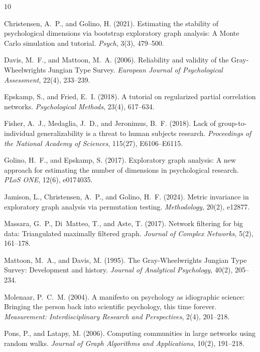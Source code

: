 \documentclass[11pt]{article}
\begin{document}

\begin{thebibliography}{10}

Christensen, A.~P., and Golino, H. (2021).
Estimating the stability of psychological dimensions via bootstrap
exploratory graph analysis: A Monte Carlo simulation and tutorial.
\emph{Psych}, 3(3), 479--500.

Davis, M.~F., and Mattoon, M.~A. (2006).
Reliability and validity of the Gray-Wheelwrights Jungian Type Survey.
\emph{European Journal of Psychological Assessment}, 22(4), 233--239.

Epskamp, S., and Fried, E.~I. (2018).
A tutorial on regularized partial correlation networks.
\emph{Psychological Methods}, 23(4), 617--634.

Fisher, A.~J., Medaglia, J.~D., and Jeronimus, B.~F. (2018).
Lack of group-to-individual generalizability is a threat to human subjects
research. \emph{Proceedings of the National Academy of Sciences}, 115(27),
E6106--E6115.

Golino, H.~F., and Epskamp, S. (2017).
Exploratory graph analysis: A new approach for estimating the number of
dimensions in psychological research. \emph{PLoS ONE}, 12(6), e0174035.

Jamison, L., Christensen, A.~P., and Golino, H.~F. (2024).
Metric invariance in exploratory graph analysis via permutation testing.
\emph{Methodology}, 20(2), e12877.

Massara, G.~P., Di~Matteo, T., and Aste, T. (2017).
Network filtering for big data: Triangulated maximally filtered graph.
\emph{Journal of Complex Networks}, 5(2), 161--178.

Mattoon, M.~A., and Davis, M. (1995).
The Gray-Wheelwrights Jungian Type Survey: Development and history.
\emph{Journal of Analytical Psychology}, 40(2), 205--234.

Molenaar, P.~C.~M. (2004).
A manifesto on psychology as idiographic science: Bringing the person back
into scientific psychology, this time forever. \emph{Measurement:
Interdisciplinary Research and Perspectives}, 2(4), 201--218.

Pons, P., and Latapy, M. (2006).
Computing communities in large networks using random walks.
\emph{Journal of Graph Algorithms and Applications}, 10(2), 191--218.

\end{thebibliography}
\end{document}

